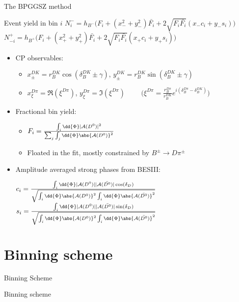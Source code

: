 \documentclass{beamer}
\begin{document}
\begin{frame}{The BPGGSZ method}
  \begin{block}{Event yield in bin $i$}
    \scriptsize
    $N^-_i = h_{B^-}\big(F_i + (x_-^2 + y_-^2)\bar{F_i} + 2\sqrt{F_i\bar{F_i}}(x_-c_i + y_-s_i)\big)$ \\
    $N^+_{-i} = h_{B^+}\big(F_i + (x_+^2 + y_+^2)\bar{F_i} + 2\sqrt{F_i\bar{F_i}}(x_+c_i + y_+s_i)\big)$
  \end{block}
  \begin{itemize}
    \item{CP observables:}
    \begin{itemize}
      \item{$x_\pm^{DK} = r_B^{DK}\cos(\delta_B^{DK}\pm\gamma)$, \quad $y_\pm^{DK} = r_B^{DK}\sin(\delta_B^{DK}\pm\gamma)$}
      \item{$x_\xi^{D\pi} = \Re(\xi^{D\pi})$, $y_\xi^{D\pi} = \Im(\xi^{D\pi})$ $\quad\quad\Big(\xi^{D\pi} = \frac{r_B^{D\pi}}{r_B^{DK}}e^{i(\delta_B^{D\pi} - \delta_B^{DK})}\Big)$}
    \end{itemize}
    \item{Fractional bin yield:}
    \begin{itemize}
      \item{$F_i = \frac{\int_i\dd{\Phi}|\mathcal{A}(D^0)|^2}{\sum_j\int_j\dd{\Phi}\abs{\mathcal{A}(D^0)}^2}$}
      \item{Floated in the fit, mostly constrained by $B^\pm\to D\pi^\pm$}
    \end{itemize}
  \end{itemize}
  \begin{itemize}
    \item{Amplitude averaged strong phases from BESIII:}
    \begin{center}
      $c_i = \frac{\int_i\dd{\Phi}|\mathcal{A}(D^0)||\mathcal{A}(\bar{D^0})|\cos(\delta_D)}{\sqrt{\int_i\dd{\Phi}\abs{\mathcal{A}(D^0)}^2\int_i\dd{\Phi}\abs{\mathcal{A}(\bar{D^0})}^2}}$ \quad $s_i = \frac{\int_i\dd{\Phi}|\mathcal{A}(D^0)||\mathcal{A}(\bar{D^0})|\sin(\delta_D)}{\sqrt{\int_i\dd{\Phi}\abs{\mathcal{A}(D^0)}^2\int_i\dd{\Phi}\abs{\mathcal{A}(\bar{D^0})}^2}}$
    \end{center}
  \end{itemize}
\end{frame}

\section{Binning scheme}
\begin{frame}{Binning Scheme}
  \begin{center}
    {\huge Binning scheme}
  \end{center}
\end{frame}
\end{document}
